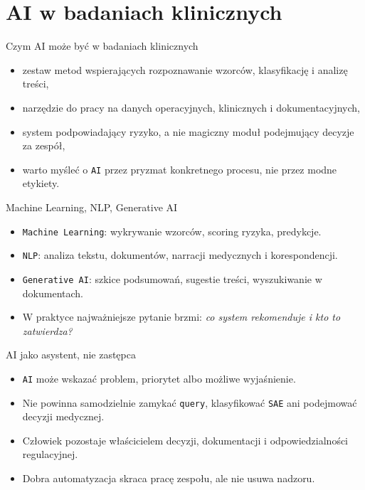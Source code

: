 \section{AI w badaniach klinicznych}


\begin{frame}{Czym AI może być w badaniach klinicznych}
  \begin{itemize}
    \item zestaw metod wspierających rozpoznawanie wzorców, klasyfikację i analizę treści,
    \item narzędzie do pracy na danych operacyjnych, klinicznych i dokumentacyjnych,
    \item system podpowiadający ryzyko, a nie magiczny moduł podejmujący decyzje za zespół,
    \item warto myśleć o \texttt{AI} przez pryzmat konkretnego procesu, nie przez modne etykiety.
  \end{itemize}
\end{frame}

\begin{frame}{Machine Learning, NLP, Generative AI}
  \begin{itemize}
    \item \texttt{Machine Learning}: wykrywanie wzorców, scoring ryzyka, predykcje.
    \item \texttt{NLP}: analiza tekstu, dokumentów, narracji medycznych i korespondencji.
    \item \texttt{Generative AI}: szkice podsumowań, sugestie treści, wyszukiwanie w dokumentach.
    \item W praktyce najważniejsze pytanie brzmi: \emph{co system rekomenduje i kto to zatwierdza?}
  \end{itemize}
\end{frame}

\begin{frame}{AI jako asystent, nie zastępca}
  \begin{itemize}
    \item \texttt{AI} może wskazać problem, priorytet albo możliwe wyjaśnienie.
    \item Nie powinna samodzielnie zamykać \texttt{query}, klasyfikować \texttt{SAE} ani podejmować decyzji medycznej.
    \item Człowiek pozostaje właścicielem decyzji, dokumentacji i odpowiedzialności regulacyjnej.
    \item Dobra automatyzacja skraca pracę zespołu, ale nie usuwa nadzoru.
  \end{itemize}
\end{frame}

